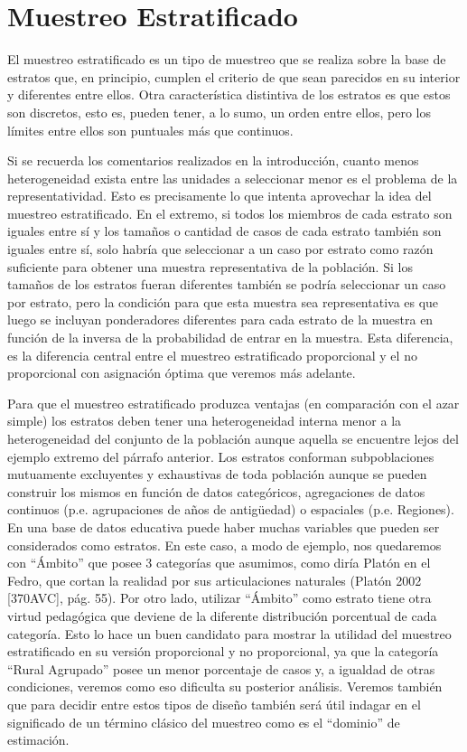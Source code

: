 \documentclass[
  spanish,
  a4paper,
]{scrreprt}
\begin{document}
\section{Muestreo Estratificado}\label{sec-estratificado}

El muestreo estratificado es un tipo de muestreo que se realiza sobre la
base de estratos que, en principio, cumplen el criterio de que sean
parecidos en su interior y diferentes entre ellos. Otra característica
distintiva de los estratos es que estos son discretos, esto es, pueden
tener, a lo sumo, un orden entre ellos, pero los límites entre ellos son
puntuales más que continuos.

Si se recuerda los comentarios realizados en la introducción, cuanto
menos heterogeneidad exista entre las unidades a seleccionar menor es el
problema de la representatividad. Esto es precisamente lo que intenta
aprovechar la idea del muestreo estratificado. En el extremo, si todos
los miembros de cada estrato son iguales entre sí y los tamaños o
cantidad de casos de cada estrato también son iguales entre sí, solo
habría que seleccionar a un caso por estrato como razón suficiente para
obtener una muestra representativa de la población. Si los tamaños de
los estratos fueran diferentes también se podría seleccionar un caso por
estrato, pero la condición para que esta muestra sea representativa es
que luego se incluyan ponderadores diferentes para cada estrato de la
muestra en función de la inversa de la probabilidad de entrar en la
muestra. Esta diferencia, es la diferencia central entre el muestreo
estratificado proporcional y el no proporcional con asignación óptima
que veremos más adelante.

Para que el muestreo estratificado produzca ventajas (en comparación con
el azar simple) los estratos deben tener una heterogeneidad interna
menor a la heterogeneidad del conjunto de la población aunque aquella se
encuentre lejos del ejemplo extremo del párrafo anterior. Los estratos
conforman subpoblaciones mutuamente excluyentes y exhaustivas de toda
población aunque se pueden construir los mismos en función de datos
categóricos, agregaciones de datos continuos (p.e. agrupaciones de años
de antigüedad) o espaciales (p.e. Regiones). En una base de datos
educativa puede haber muchas variables que pueden ser considerados como
estratos. En este caso, a modo de ejemplo, nos quedaremos con ``Ámbito''
que posee 3 categorías que asumimos, como diría Platón en el Fedro, que
cortan la realidad por sus articulaciones naturales (Platón 2002
{[}370AVC{]}, pág. 55). Por otro lado, utilizar ``Ámbito'' como estrato
tiene otra virtud pedagógica que deviene de la diferente distribución
porcentual de cada categoría. Esto lo hace un buen candidato para
mostrar la utilidad del muestreo estratificado en su versión
proporcional y no proporcional, ya que la categoría ``Rural Agrupado''
posee un menor porcentaje de casos y, a igualdad de otras condiciones,
veremos como eso dificulta su posterior análisis. Veremos también que
para decidir entre estos tipos de diseño también será útil indagar en el
significado de un término clásico del muestreo como es el ``dominio'' de
estimación.
\end{document}
